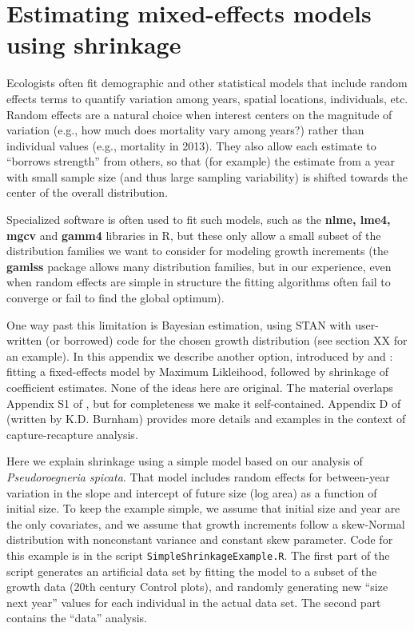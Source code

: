 \documentclass[12pt]{article}
\begin{document}
\section{Estimating mixed-effects models using shrinkage}

Ecologists often fit demographic and other statistical models that include random effects terms to
quantify variation among years, spatial locations, individuals, etc. Random effects
are a natural choice when interest centers on the magnitude of variation (e.g., how much does mortality vary among years?)  
rather than individual values (e.g., mortality in 2013). They also allow each estimate to 
``borrows strength'' from others, so that (for example) the estimate from a year with small sample size (and thus large 
sampling variability) is shifted towards the center of the overall distribution. 

Specialized software is often used to fit such models, such as the \textbf{nlme, lme4, mgcv} and \textbf{gamm4} libraries in R,  
but these only allow a small subset of the distribution families we want to consider for modeling growth increments (the \textbf{gamlss} 
package allows many distribution families, but in our experience, even when random effects are simple in structure 
the fitting algorithms often fail to converge or fail to find the global optimum). 

One way past this limitation is Bayesian estimation, using STAN with user-written (or borrowed) 
code for the chosen growth distribution (see section XX for an example). 
In this appendix we describe another option, introduced by \citet{link-nichols-1994} and \citet{gould-nichols-1998}: 
fitting a fixed-effects model by Maximum Likleihood, followed by shrinkage of coefficient estimates. 
None of the ideas here are original. The material overlaps Appendix S1 of \citet{metcalf-etal-2015}, 
but for completeness we make it self-contained. Appendix D of \citet{cooch-white-2020} (written by K.D. Burnham)
provides more details and examples in the context of capture-recapture analysis. 

Here we explain shrinkage using a simple model based on our analysis of \emph{Pseudoroegneria spicata}. 
That model includes random effects for between-year variation in the slope and intercept of future size 
(log area) as a function of initial size. To keep the example simple, we assume that initial size 
and year are the only covariates, and we assume that growth increments 
follow a skew-Normal distribution with nonconstant variance and constant skew parameter. 
Code for this example is in the script \texttt{SimpleShrinkageExample.R}. The first part of the script generates
an artificial data set by fitting the model to a subset of the growth data (20th century Control plots), and
randomly generating new ``size next year'' values for each individual in the actual data set. 
The second part contains the ``data'' analysis. 
\end{document}
